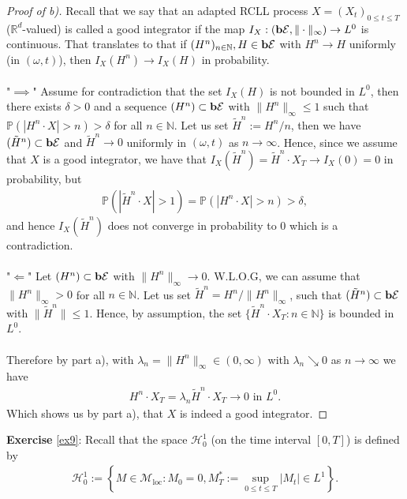 \documentclass[12pt,a4paper, twoside]{article}
\theoremstyle{definition}
\newcommand{\PP}{\mathbb{P}} %
\newcommand{\simple}{\textbf{\text{b}}\mathcal{E}}
\begin{document}
\newpage
\begin{proof}[Proof of b)]
Recall that we say that an adapted RCLL process $X=(X_t)_{0 \leq t \leq T}$ ($\mathbb{R}^d$-valued) is called a good integrator if the map $I_X:( \simple, \| \cdot \|_\infty) \to L^0$ is continuous. That translates to that if $(H^n)_{n \in \mathbb{N}}, H \in \simple$ with $H^n \to H$ uniformly (in $(\omega,t)$), then $I_X(H^n) \to I_X(H)$ in probability. 
\\\\
"$\implies$" Assume for contradiction that the set $I_X(H)$ is not bounded in $L^0$, then there exists $\delta>0$ and a sequence $(H^n) \subset \simple$ with $\|H^n\|_\infty \leq 1$ such that $\PP( |H^n \cdot X| > n) > \delta$ for all $n \in \mathbb{N}$. Let us set $\tilde{H}^n := H^n/n$, then we have $(\tilde{H}^n) \subset \simple$ and $\tilde{H}^n \to 0$ uniformly in $( \omega,t)$ as $n \to \infty$. Hence, since we assume that $X$ is a good integrator, we have that $I_X(\tilde{H}^n)=\tilde{H}^n \cdot X_T \to I_X(0) = 0$ in probability, but
\begin{align*}
\PP(| \tilde{H}^n \cdot X| > 1) = \PP(|H^n \cdot X| >n) > \delta,
\end{align*}
and hence $ I_X(\tilde{H}^n)$ does not converge in probability to $0$ which is a contradiction.
\\\\
"$\Longleftarrow$" Let $(H^n) \subset \simple$ with $\|H^n\|_\infty \to 0$. W.L.O.G, we can assume that $\|H^n\|_\infty >0$ for all $n \in \mathbb{N}$. Let us set $\tilde{H}^n = H^n/ \|H^n\|_\infty$, such that $(\tilde{H}^n) \subset \simple$ with $\| \tilde{H}^n\| \leq 1$. Hence, by assumption, the set $\{\tilde{H}^n \cdot X_T : n \in \mathbb{N}\}$ is bounded in $L^0$.
\\\\
Therefore by part a), with $\lambda_n = \|H^n\|_\infty \in (0, \infty)$ with $\lambda_n \searrow 0$ as $n \to \infty$  we have \begin{align*}
H^n \cdot X_T = \lambda_n \tilde{H}^n \cdot X_T \to 0 \text{ in } L^0.
\end{align*}
Which shows us by part a), that $X$ is indeed a good integrator.
\end{proof}
\newpage
\noindent \textbf{Exercise} \ref{ex9}: Recall that the space $\mathcal{H}_0^1$ (on the time interval $[0, T]$) is defined by
\begin{align*}
\mathcal{H}_0^1:= \left\{ M \in \mathcal{M}_\text{loc} : M_0=0, M_T^*:= \sup_{0 \leq t \leq T} |M_t| \in L^1\right\}.
\end{align*}
\end{document}
